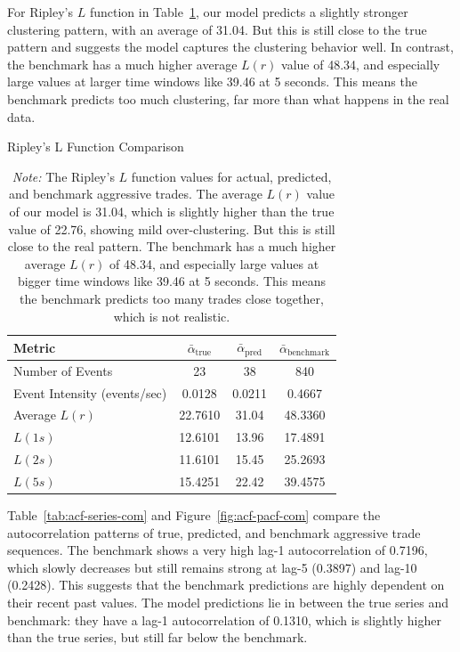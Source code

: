For Ripley's \(L\) function in Table~\ref{tb:ripley-l_com}, our model predicts a slightly stronger clustering pattern, with an average of 31.04. But this is still close to the true pattern and suggests the model captures the clustering behavior well. In contrast, the benchmark has a much higher average \(L(r)\) value of 48.34, and especially large values at larger time windows like 39.46 at 5 seconds. This means the benchmark predicts too much clustering, far more than what happens in the real data. 

\begin{table}[tbp]
    \centering
    \caption{Ripley's L Function Comparison} 
    \caption*{\textit{Note:} The Ripley's \(L\) function values for actual, predicted, and benchmark aggressive trades. The average \(L(r)\) value of our model is 31.04, which is slightly higher than the true value of 22.76, showing mild over-clustering. But this is still close to the real pattern. The benchmark has a much higher average \(L(r)\) of 48.34, and especially large values at bigger time windows like 39.46 at 5 seconds. This means the benchmark predicts too many trades close together, which is not realistic.}

    \begin{tabular}{lccc}
    \toprule
    \textbf{Metric} & $\bar{\alpha}_\text{true}$ & $\bar{\alpha}_\text{pred}$ & $\bar{\alpha}_\text{benchmark}$ \\
    \midrule
    Number of Events & 23 & 38 & 840 \\
    Event Intensity (events/sec) & 0.0128 & 0.0211 & 0.4667 \\
    Average \( L(r) \) & 22.7610 & 31.04 & 48.3360 \\
    \( L(1s) \) & 12.6101 & 13.96 & 17.4891\\
    \( L(2s) \) & 11.6101 & 15.45 & 25.2693\\
    \( L(5s) \) & 15.4251 & 22.42 & 39.4575\\
    \bottomrule
    \end{tabular}
    \label{tb:ripley-l_com}
\end{table}

Table~\ref{tab:acf-series-com} and Figure~\ref{fig:acf-pacf-com} compare the autocorrelation patterns of true, predicted, and benchmark aggressive trade sequences. The benchmark shows a very high lag-1 autocorrelation of 0.7196, which slowly decreases but still remains strong at lag-5 (0.3897) and lag-10 (0.2428). This suggests that the benchmark predictions are highly dependent on their recent past values. The model predictions lie in between the true series and benchmark: they have a lag-1 autocorrelation of 0.1310, which is slightly higher than the true series, but still far below the benchmark. 


